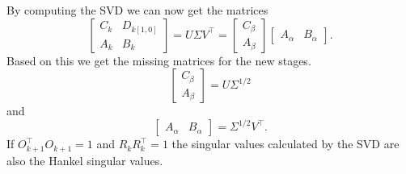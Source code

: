 \documentclass[doctype=mastersthesis,BCOR=15mm,biblatex]{ldvbook}%
\begin{document}
By computing the SVD we can now get the matrices
\begin{equation}
\begin{bmatrix}
C_k & D_{k[1,0]}\\
A_k & B_k
\end{bmatrix} = U \Sigma V^\top = \begin{bmatrix} C_\beta \\  A_\beta \end{bmatrix}
\begin{bmatrix} A_\alpha &  B_\alpha  \end{bmatrix}
.
\end{equation}
Based on this we get the missing matrices for the new stages.
\begin{equation}
\begin{bmatrix} C_\beta \\  A_\beta \end{bmatrix} = U \Sigma^{1/2}
\end{equation}
and
\begin{equation}
\begin{bmatrix} A_\alpha &  B_\alpha  \end{bmatrix} = \Sigma^{1/2} V^\top
.
\end{equation}
If $O_{k+1}^\top O_{k+1} = 1$ and $R_k  R_k^\top = 1$ the singular values calculated by the SVD are also the Hankel singular values.
\end{document}
